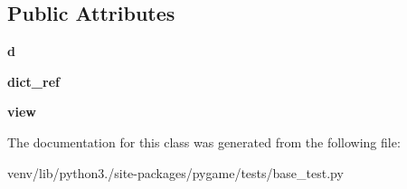 \subsection*{Public Attributes}
\begin{DoxyCompactItemize}
\item 
\mbox{\label{classpygame_1_1tests_1_1base__test_1_1_base_module_test_afa9514f6870cca7522e5c13db65d56ae}} 
{\bfseries d}
\item 
\mbox{\label{classpygame_1_1tests_1_1base__test_1_1_base_module_test_aa2823167f9c91e81a7fc345ee08d6934}} 
{\bfseries dict\+\_\+ref}
\item 
\mbox{\label{classpygame_1_1tests_1_1base__test_1_1_base_module_test_a2d310c635383c57e438026b9fb3e0da1}} 
{\bfseries view}
\end{DoxyCompactItemize}


The documentation for this class was generated from the following file\+:\begin{DoxyCompactItemize}
\item 
venv/lib/python3./site-\/packages/pygame/tests/base\+\_\+test.\+py\end{DoxyCompactItemize}
